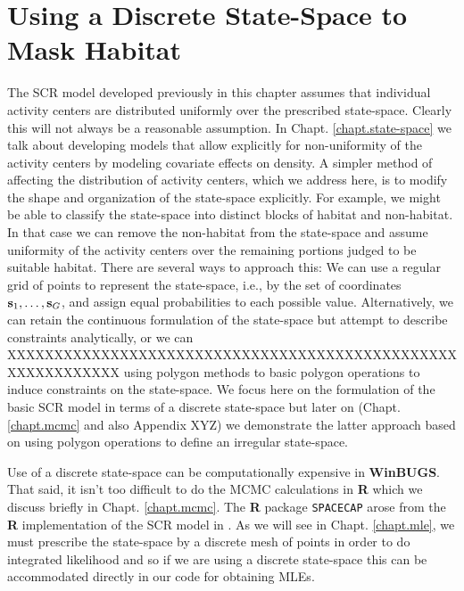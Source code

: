 {\section{Using a Discrete State-Space to Mask Habitat}
\label{scr0.sec.discrete}

The SCR model developed previously in this chapter assumes that
individual activity centers are distributed uniformly over the
prescribed state-space. Clearly this will not always be a reasonable
assumption. In Chapt. \ref{chapt.state-space} we talk about developing models
that allow explicitly for non-uniformity of the activity centers by
modeling covariate effects on density. A simpler method of affecting
the distribution of activity centers, which we address here, is to
modify the shape and organization of the state-space explicitly. For example, we might
be able to classify the state-space into distinct blocks of habitat
and non-habitat. In that case we can remove the non-habitat from the
state-space and assume uniformity of the activity centers over the
remaining portions judged to be suitable habitat.  There are several ways
to approach this: We can use a regular grid of points to represent the
state-space, i.e., by the set of coordinates ${\bf s}_1, \ldots, {\bf
  s}_{G}$, and assign  equal probabilities to each possible
value. Alternatively, 
we can retain the continuous formulation of the state-space but
attempt to describe constraints analytically, or we can 
XXXXXXXXXXXXXXXXXXXXXXXXXXXXXXXXXXXXXXXXXXXXXXXXXXXXXXXXXXXX
using polygon methods
to 
basic polygon operations to induce constraints on the state-space. We
focus here on the formulation of the basic SCR model in terms of a
discrete state-space but later on (Chapt. \ref{chapt.mcmc} and also
Appendix XYZ) we demonstrate the latter approach based on using
polygon operations to define an irregular state-space.

Use of a discrete state-space can be computationally expensive in {\bf
  WinBUGS}. That said, it isn't too difficult to do the MCMC
calculations in {\bf R} which we discuss briefly in Chapt.
\ref{chapt.mcmc}. The {\bf R} package {\tt SPACECAP}
\citep{gopalaswamy_etal:2011} arose from the {\bf R} implementation of the SCR model  in \citet{royle_etal:2009}.  As we will
see in Chapt. \ref{chapt.mle}, we must prescribe the state-space by a
discrete mesh of points in order to do integrated likelihood and so if
we are using a discrete state-space this can be accommodated directly
in our code for obtaining MLEs.

}
